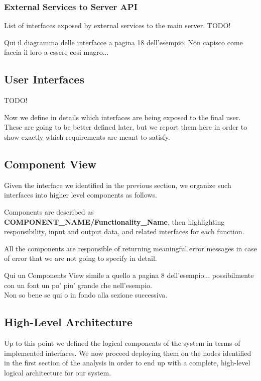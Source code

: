 \documentclass[11pt]{article} %
\begin{document}
\begin{description}
\subsubsection{External Services to Server API}
List of interfaces exposed by external services to the main server. {\color{red} {TODO! }} 

{\color{blue} { Qui il diagramma delle interfacce a pagina 18 dell'esempio. Non capisco come faccia il loro a essere cosi magro...}}

\subsection{User Interfaces}

{\color{red} {TODO! }}

Now we define in details which interfaces are being exposed to the final user. These are going to be better defined later, but we report them here in order to show exactly which requirements are meant to satisfy.




\subsection{Component View}
Given the interface we identified in the previous section, we organize such interfaces into higher level components as follows.

Components are described as \textbf{COMPONENT\_NAME/Functionality\_Name}, then highlighting responsibility, input and output data, and related interfaces for each function.

All the components are responsible of returning meaningful error messages in case of error that we are not going to specify in detail.


{\color{blue} { Qui un Components View simile a quello a pagina 8 dell'esempio... possibilmente con un font un po' piu' grande che nell'esempio. \\ Non so bene se qui o in fondo alla sezione successiva. }}



\subsection{High-Level Architecture}

Up to this point we defined the logical components of the system in terms of implemented interfaces. We now proceed deploying them on the nodes identified in the first section of the analysis in order to end up with a complete, high-level logical architecture for our system.



\end{description}
\end{document}
